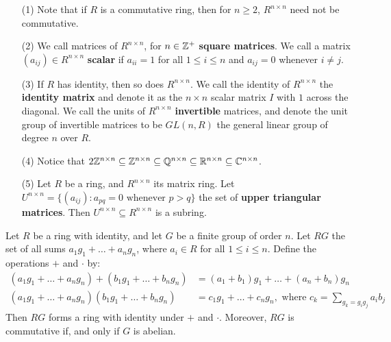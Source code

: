 \begin{example}\label{1.7}
    \begin{enumerate}
        \item[(1)] Note that if $R$ is a commutative ring, then for $n \geq 2$,
            $R^{n \times n}$ need not be commutative.

        \item[(2)] We call matrices of $R^{n \times n}$, for $n \in \mathbb{Z}^+$
            \textbf{square matrices}. We call a matrix $(a_{ij}) \in R^{n \times
            n}$ \textbf{scalar} if $a_{ii}=1$ for all $1 \leq i \leq n$ and
            $a_{ij}=0$ whenever $i \neq j$.

        \item[(3)] If $R$ has identity, then so does  $R^{n \times n}$. We call
            the identity of $R^{n \times n}$ the \textbf{identity matrix} and
            denote it as the $n \times n$ scalar matrix  $I$ with $1$ across the
            diagonal. We call the units of $R^{n \times n}$ \textbf{invertible}
            matrices, and denote the unit group of invertible matrices to be
            $GL(n,R)$ the general linear group of degree $n$ over $R$.

        \item[(4)] Notice that $2\mathbb{Z}^{n \times n} \subseteq \mathbb{Z}^{n \times n}
            \subseteq \mathbb{Q}^{n \times n} \subseteq \mathbb{R}^{n \times n} \subseteq \mathbb{C}^{n
            \times n}$.

        \item[(5)] Let $R$ be a ring, and  $R^{n \times n}$ its matrix ring.
            Let $U^{n \times n}=\{(a_{ij}) : a_{pq}=0 \text{ whenever } p>q\}$
            the set of \textbf{upper triangular matrices}. Then $U^{n \times n}
            \subseteq R^{n \times n}$ is a subring.
    \end{enumerate}
\end{example}

\begin{theorem}\label{1.2.4}
    Let $R$ be a ring with identity, and let $G$ be a finite group of order $n$.
    Let $RG$ the set of all sums $a_1g_1+\dots+a_ng_n$, where $a_i \in R$ for
    all  $1 \leq i \leq n$. Define the operations $+$ and $\cdot$ by:
    \begin{align*}
        (a_1g_1+\dots+a_ng_n)+(b_1g_1+\dots+b_ng_n) &= (a_1+b_1)g_1+\dots+(a_n+b_n)g_n \\
        (a_1g_1+\dots+a_ng_n)(b_1g_1+\dots+b_ng_n)  &=  c_1g_1+\dots+c_ng_n,
        \text{ where } c_k=\sum_{g_k=g_ig_j}{a_ib_j}
    \end{align*}
    Then $RG$ forms a ring with identity under  $+$ and  $\cdot$. Moreover, $RG$
    is commutative if, and only if $G$ is abelian.
\end{theorem}

